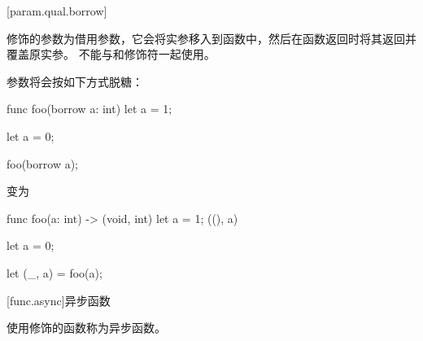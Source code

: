 [param.qual.borrow]{}

\pnum
{}修饰的参数为借用参数，它会将实参移入到函数中，然后在函数返回时将其返回并覆盖原实参。
不能与和修饰符一起使用。

\pnum
{}参数将会按如下方式脱糖：

\begin{codeblock}
func foo(borrow a: int) {
    let a = 1;
}

let a = 0;

foo(borrow a);
\end{codeblock}
变为
\begin{codeblock}
func foo(a: int) -> (void, int) {
    let a = 1;
    ((), a)
}

let a = 0;

let (_, a) = foo(a);
\end{codeblock}

[func.async]{异步函数}

\pnum
使用修饰的函数称为异步函数。